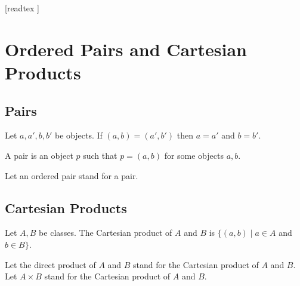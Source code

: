 \documentclass[10pt]{article}
\begin{document}
  \begin{imports}
    \begin{forthel}
      [readtex ]
    \end{forthel}
  \end{imports}


  \section*{Ordered Pairs and Cartesian Products}

  \subsection*{Pairs}

  \begin{forthel}
    \begin{axiom}[id=FOUNDATIONS_04_8464577431863296,printid]
      Let $a, a', b, b'$ be objects.
      If $(a, b) = (a', b')$ then $a = a'$ and $b = b'$.
    \end{axiom}
  \end{forthel}

  \begin{forthel}
    \begin{definition}[id=FOUNDATIONS_04_4782386822774784,printid]
      A pair is an object $p$ such that $p = (a, b)$ for some objects $a, b$.
    \end{definition}

    Let an ordered pair stand for a pair.
  \end{forthel}


  \subsection*{Cartesian Products}

  \begin{forthel}
    \begin{definition}[id=FOUNDATIONS_04_2877806274936832,printid]
      Let $A, B$ be classes.
      The Cartesian product of $A$ and $B$ is $\{ (a, b) \mid a \in A$ and $b \in B \}$.
    \end{definition}

    Let the direct product of $A$ and $B$ stand for  the Cartesian product of $A$ and $B$.
    Let $A \times B$ stand for the Cartesian product of $A$ and $B$.
  \end{forthel}
\end{document}
